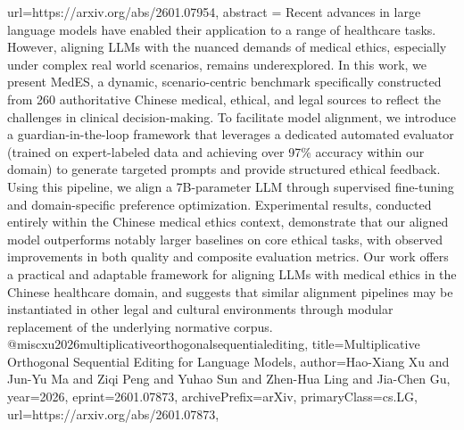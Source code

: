 {      url={https://arxiv.org/abs/2601.07954},
      abstract = {Recent advances in large language models have enabled their application to a range of healthcare tasks. However, aligning LLMs with the nuanced demands of medical ethics, especially under complex real world scenarios, remains underexplored. In this work, we present MedES, a dynamic, scenario-centric benchmark specifically constructed from 260 authoritative Chinese medical, ethical, and legal sources to reflect the challenges in clinical decision-making. To facilitate model alignment, we introduce a guardian-in-the-loop framework that leverages a dedicated automated evaluator (trained on expert-labeled data and achieving over 97\% accuracy within our domain) to generate targeted prompts and provide structured ethical feedback. Using this pipeline, we align a 7B-parameter LLM through supervised fine-tuning and domain-specific preference optimization. Experimental results, conducted entirely within the Chinese medical ethics context, demonstrate that our aligned model outperforms notably larger baselines on core ethical tasks, with observed improvements in both quality and composite evaluation metrics. Our work offers a practical and adaptable framework for aligning LLMs with medical ethics in the Chinese healthcare domain, and suggests that similar alignment pipelines may be instantiated in other legal and cultural environments through modular replacement of the underlying normative corpus.}
}@misc{xu2026multiplicativeorthogonalsequentialediting,
      title={Multiplicative Orthogonal Sequential Editing for Language Models}, 
      author={Hao-Xiang Xu and Jun-Yu Ma and Ziqi Peng and Yuhao Sun and Zhen-Hua Ling and Jia-Chen Gu},
      year={2026},
      eprint={2601.07873},
      archivePrefix={arXiv},
      primaryClass={cs.LG},
      url={https://arxiv.org/abs/2601.07873},
}
